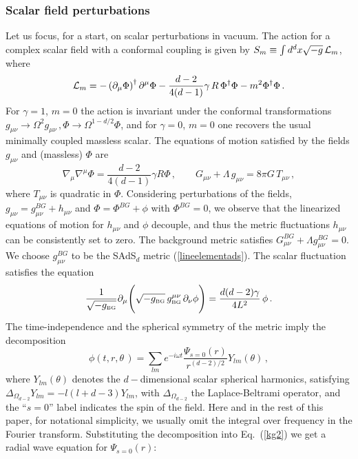 \documentclass[]{iopart}
\def\be{\begin{equation}}
\def\ee{\end{equation}}
\begin{document}
\subsubsection*{Scalar field perturbations}
Let us focus, for a start, on scalar perturbations in vacuum. The
action for a complex scalar field with a conformal coupling is given by 
$S_m \equiv \int d^dx\sqrt{-g}\, {\cal L}_m$, where
%
\be
 {\cal L}_m = - \left(\partial_{\mu}\Phi\right)^\dagger\partial^{\mu}\Phi -
\frac{d-2}{4(d-1)} \gamma \, R \, \Phi^\dagger \Phi 
- m^2  \Phi^\dagger \Phi\,.
\ee
%
For $\gamma =1$, $m=0$ the action is invariant under the conformal
transformations $g_{\mu\nu}\rightarrow
\Omega^2g_{\mu\nu}\,,\Phi\rightarrow\Omega^{1-d/2}\Phi$, and for $\gamma=0$,
$m=0$ one recovers the usual minimally coupled massless scalar. The equations
of motion satisfied by the fields $g_{\mu\nu}$ and (massless) $\Phi$ are
%
\be \nabla_{\mu}\nabla^{\mu}\Phi=\frac{d-2}{4(d-1)}\gamma R
\Phi\,,\label{kg}\qquad G_{\mu\nu}+ \Lambda\,
g_{\mu\nu}=8 \pi G \, T_{\mu\nu} \,,\ee
%
where $T_{\mu\nu}$ is quadratic in $\Phi$.  Considering perturbations of the
fields, $g_{\mu\nu} = g_{\mu\nu}^{BG} + h_{\mu\nu}$ and $\Phi = \Phi^{BG} +
\phi$ with $\Phi^{BG}=0$, we observe that the linearized equations of motion
for $h_{\mu\nu}$ and $\phi$ decouple, and thus the metric fluctuations
$h_{\mu\nu}$ can be consistently set to zero.  The background metric satisfies
$G_{\mu\nu}^{BG} +\Lambda g_{\mu\nu}^{BG}=0$.  We choose $g_{\mu\nu}^{BG}$ to
be the SAdS$_d$ metric (\ref{lineelementads}). The scalar fluctuation
satisfies the equation
%
\be \frac{1}{\sqrt{-g_{\mbox{\tiny BG}}}}\partial_{\mu}
\Biggl( \sqrt{-g_{\mbox{\tiny BG}}}\,  g^{\mu\nu}_{{\mbox{\tiny BG}}}\, \partial_{\nu}\phi\Biggr) = 
\frac{d(d-2)\gamma}{4L^2}\, \phi\,. \label{kg2} \ee
%
The time-independence and the spherical symmetry of the metric imply the
decomposition
%
\be \phi(t,r,\theta \,)=\sum _{lm} e^{-i\omega t}
\frac{\Psi_{s=0}(r)}{r^{(d-2)/2}}Y_{lm}(\theta)\,,
\label{separationscalar} \ee
%
where $Y_{lm}(\theta)$ denotes the $d-$dimensional scalar spherical
harmonics, satisfying $\Delta_{\Omega_{d-2}}Y_{lm}=-l(l+d-3)Y_{lm}$, with
$\Delta_{\Omega_{d-2}}$ the Laplace-Beltrami operator, and the ``$s=0$'' label
indicates the spin of the field. Here and in the rest of this paper, for
notational simplicity, we usually omit the integral over frequency in the
Fourier transform.  Substituting the decomposition into Eq.~(\ref{kg2}) we get
a radial wave equation for $\Psi_{s=0}(r)$:
\end{document}
